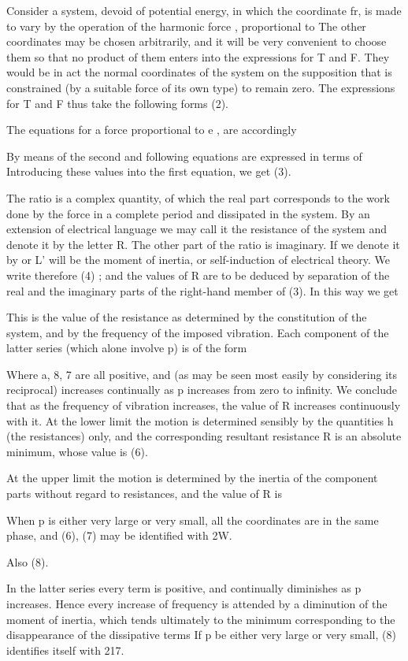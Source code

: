 Consider a system, devoid of potential energy, in which the
coordinate fr, is made to vary by the operation of the harmonic
force , proportional to The other coordinates may be chosen
arbitrarily, and it will be very convenient to choose them so that
no product of them enters into the expressions for T and F. They
would be in act the normal coordinates of the system on the
supposition that is constrained (by a suitable force of its own type)
to remain zero. The expressions for T and F thus take the
following forms (2).

The equations for a force proportional to e , are accordingly

By means of the second and following equations are
expressed in terms of Introducing these values into the first
equation, we get (3).

The ratio is a complex quantity, of which the real part
corresponds to the work done by the force in a complete period
and dissipated in the system. By an extension of electrical
language we may call it the resistance of the system and denote it
by the letter R. The other part of the ratio is imaginary. If we
denote it by or L' will be the moment of inertia, or
self-induction of electrical theory. We write therefore (4) ;
and the values of R are to be deduced by separation of the
real and the imaginary parts of the right-hand member of (3). In
this way we get


This is the value of the resistance as determined by the
constitution of the system, and by the frequency of the imposed
vibration. Each component of the latter series (which alone involve p)
is of the form

Where a, 8, 7 are all positive,
and (as may be seen most easily by considering its reciprocal)
increases continually as p increases from zero to infinity. We
conclude that as the frequency of vibration increases, the value of
R increases continuously with it. At the lower limit the motion
is determined sensibly by the quantities h (the resistances) only, and
the corresponding resultant resistance R is an absolute minimum,
whose value is (6).

At the upper limit the motion is determined by the inertia of
the component parts without regard to resistances, and the value
of R is

When p is either very large or very small, all the coordinates
are in the same phase, and (6), (7) may be identified with 2W.

Also (8).

In the latter series every term is positive, and continually
diminishes as p increases. Hence every increase of frequency is
attended by a diminution of the moment of inertia, which tends
ultimately to the minimum corresponding to the disappearance of
the dissipative terms
If p be either very large or very small, (8) identifies itself
with 217.

